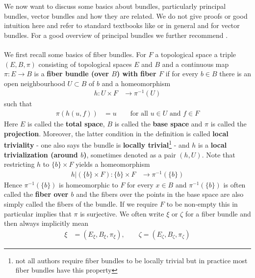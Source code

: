 We now want to discuss some basics about bundles, particularly principal bundles, vector bundles and how they are related. We do not give proofs or good intuition here and refer to standard textbooks like \cite{f215dbd0} or \cite{797789bc} in general and \cite{c7f15065} for vector bundles. For a good overview of principal bundles we further recommend \cite{4dc38f27}.
\\\\
We first recall some basics of fiber bundles. For $F$ a topological space a triple $(E,B,\pi)$ consisting of topological spaces $E$ and $B$ and a continuous map $\pi \colon E \to B$ is a \textbf{fiber bundle (over $B$) with fiber $F$} if for every $b \in B$ there is an open neighbourhood $U \subset B$ of $b$ and a homeomorphism
\begin{align*}
  h
  \colon
  U
  \times
  F
  &\to
  \pi^{-1}(U)
\end{align*}
such that
\begin{align*}
  \pi
  \left(
    h(u,f)
  \right)
  &=
  u
  \qquad
  \text{for all }
  u
  \in
  U
  \text{ and } 
  f
  \in
  F
\end{align*}
Here $E$ is called the \textbf{total space}, $B$ is called the \textbf{base space} and $\pi$ is called the \textbf{projection}. Moreover, the latter condition in the definition is called \textbf{local triviality} - one also says the bundle is \textbf{locally trivial}\footnote{not all authors require fiber bundles to be locally trivial but in practice most fiber bundles have this property} - and $h$ is a \textbf{local trivialization (around $b$)}, sometimes denoted as a pair $(h,U)$. Note that restricting $h$ to $\lbrace b \rbrace \times F$ yields a homeomorphism
\begin{align*}
  h
  \vert
  (\lbrace b \rbrace \times F)
  \colon
  \lbrace b \rbrace \times F
  &\to
  \pi^{-1}
  \left(
    \lbrace b \rbrace
  \right)
\end{align*}
Hence $\pi^{-1}(\lbrace b \rbrace)$ is homeomorphic to $F$ for every $x \in B$ and $\pi^{-1}(\lbrace b \rbrace)$ is often called the \textbf{fiber over $b$} and the fibers over the points in the base space are also simply called the fibers of the bundle. If we require $F$ to be non-empty this in particular implies that $\pi$ is surjective. We often write $\xi$ or $\zeta$ for a fiber bundle and then always implicitly mean
\begin{align*}
  \xi
  &=
  (E_{\xi},B_{\xi},\pi_{\xi})
  ,\qquad
  \zeta
  =
  (E_{\zeta},B_{\zeta},\pi_{\zeta})
\end{align*}
